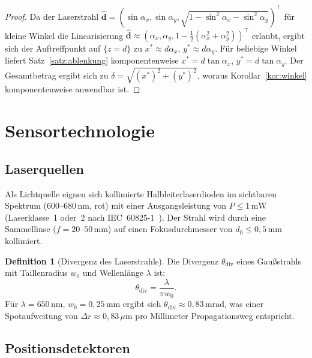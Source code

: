 ﻿\documentclass[a4paper,12pt]{article}
\theoremstyle{definition}
\newtheorem{definition}{Definition}
\begin{document}
\begin{proof}
  Da der Laserstrahl $\hat{\mathbf{d}} = (\sin\alpha_x, \sin\alpha_y, \sqrt{1-\sin^2\alpha_x-\sin^2\alpha_y})^\top$ für kleine Winkel die Linearisierung
  $\hat{\mathbf{d}} \approx (\alpha_x, \alpha_y, 1-\tfrac{1}{2}(\alpha_x^2+\alpha_y^2))^\top$
  erlaubt, ergibt sich der Auftreffpunkt auf $\{z=d\}$ zu
  $x^* \approx d\alpha_x$, $y^* \approx d\alpha_y$.
  Für beliebige Winkel liefert Satz~\ref{satz:ablenkung} komponentenweise
  $x^* = d\tan\alpha_x$, $y^* = d\tan\alpha_y$.
  Der Gesamtbetrag ergibt sich zu $\delta = \sqrt{(x^*)^2+(y^*)^2}$,
  woraus Korollar~\ref{kor:winkel} komponentenweise anwendbar ist. \qedhere
\end{proof}

\section{Sensortechnologie}

\subsection{Laserquellen}

Als Lichtquelle eignen sich kollimierte Halbleiterlaserdioden im sichtbaren
Spektrum (600--680\,nm, rot) mit einer Ausgangsleistung von $P \leq 1\,\mathrm{mW}$
(Laserklasse~1 oder~2 nach IEC~60825-1~\cite{iec60825}).
Der Strahl wird durch eine Sammellinse ($f = 20$--$50\,\mathrm{mm}$) auf einen
Fokusdurchmesser von $d_0 \leq 0{,}5\,\mathrm{mm}$ kollimiert.

\begin{definition}[Divergenz des Laserstrahls]
  Die Divergenz $\theta_{\mathrm{div}}$ eines Gaußstrahls mit Taillenradius $w_0$
  und Wellenlänge $\lambda$ ist:
  \[
    \theta_{\mathrm{div}} = \frac{\lambda}{\pi w_0}.
  \]
  Für $\lambda = 650\,\mathrm{nm}$, $w_0 = 0{,}25\,\mathrm{mm}$ ergibt sich
  $\theta_{\mathrm{div}} \approx 0{,}83\,\mathrm{mrad}$, was einer Spotaufweitung
  von $\Delta r \approx 0{,}83\,\mu\mathrm{m}$ pro Millimeter Propagationsweg entspricht.
\end{definition}

\subsection{Positionsdetektoren}
\end{document}
